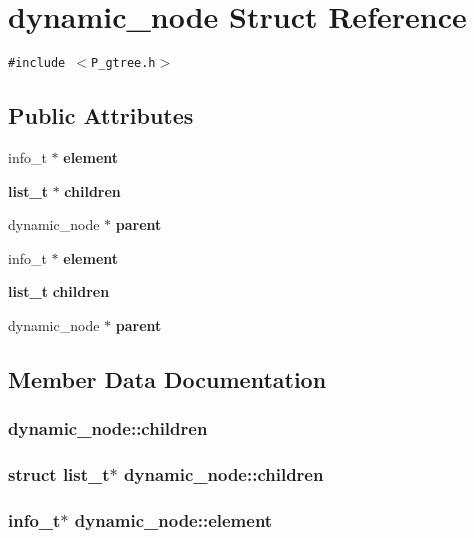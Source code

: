 \section{dynamic\_\-node  Struct Reference}
\label{structdynamic__node}
{\tt \#include $<$P\_\-gtree.h$>$}

\subsection*{Public Attributes}
\begin{CompactItemize}
\item 
info\_\-t $\ast$ {\bf element}
\item 
{\bf list\_\-t} $\ast$ {\bf children}
\item 
dynamic\_\-node $\ast$ {\bf parent}
\item 
info\_\-t $\ast$ {\bf element}
\item 
{\bf list\_\-t} {\bf children}
\item 
dynamic\_\-node $\ast$ {\bf parent}
\end{CompactItemize}


\subsection{Member Data Documentation}
\subsubsection{ dynamic\_\-node::children}\label{structdynamic__node_m4}


\subsubsection{\setlength{\rightskip}{0pt plus 5cm}struct {\bf list\_\-t}$\ast$ dynamic\_\-node::children}\label{structdynamic__node_m1}


\subsubsection{\setlength{\rightskip}{0pt plus 5cm}info\_\-t$\ast$ dynamic\_\-node::element}\label{structdynamic__node_m3}


